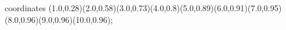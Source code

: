 					coordinates { (1.0,0.28)(2.0,0.58)(3.0,0.73)(4.0,0.8)(5.0,0.89)(6.0,0.91)(7.0,0.95)(8.0,0.96)(9.0,0.96)(10.0,0.96)};